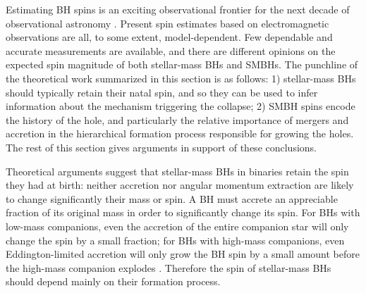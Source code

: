 \documentclass[]{iopart}
\begin{document}
Estimating BH spins is an exciting observational frontier for the next decade
of observational astronomy
\cite{Brenneman:2009hs,McClintock:2009as,Miller:2009hh}. Present spin
estimates based on electromagnetic observations are all, to some extent,
model-dependent. Few dependable and accurate measurements are available, and
there are different opinions on the expected spin magnitude of both
stellar-mass BHs and SMBHs. The punchline of the theoretical work summarized
in this section is as follows: 1) stellar-mass BHs should typically retain
their natal spin, and so they can be used to infer information about the
mechanism triggering the collapse; 2) SMBH spins encode the history of the
hole, and particularly the relative importance of mergers and accretion in the
hierarchical formation process responsible for growing the holes.  The rest of
this section gives arguments in support of these conclusions.

 Theoretical arguments suggest
that stellar-mass BHs in binaries retain the spin they had at birth: neither
accretion nor angular momentum extraction are likely to change significantly
their mass or spin.  A BH must accrete an appreciable fraction of its original
mass in order to significantly change its spin. For BHs with low-mass
companions, even the accretion of the entire companion star will only change
the spin by a small fraction; for BHs with high-mass companions, even
Eddington-limited accretion will only grow the BH spin by a small amount
before the high-mass companion explodes \cite{King:1999aq}. Therefore the spin
of stellar-mass BHs should depend mainly on their formation process. 
\end{document}
